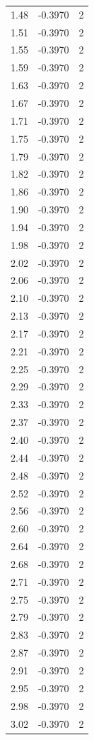 \begin{longtable}{lrr}
  1.48 & -0.3970 & 2 \\
  1.51 & -0.3970 & 2 \\
  1.55 & -0.3970 & 2 \\
  1.59 & -0.3970 & 2 \\
  1.63 & -0.3970 & 2 \\
  1.67 & -0.3970 & 2 \\
  1.71 & -0.3970 & 2 \\
  1.75 & -0.3970 & 2 \\
  1.79 & -0.3970 & 2 \\
  1.82 & -0.3970 & 2 \\
  1.86 & -0.3970 & 2 \\
  1.90 & -0.3970 & 2 \\
  1.94 & -0.3970 & 2 \\
  1.98 & -0.3970 & 2 \\
  2.02 & -0.3970 & 2 \\
  2.06 & -0.3970 & 2 \\
  2.10 & -0.3970 & 2 \\
  2.13 & -0.3970 & 2 \\
  2.17 & -0.3970 & 2 \\
  2.21 & -0.3970 & 2 \\
  2.25 & -0.3970 & 2 \\
  2.29 & -0.3970 & 2 \\
  2.33 & -0.3970 & 2 \\
  2.37 & -0.3970 & 2 \\
  2.40 & -0.3970 & 2 \\
  2.44 & -0.3970 & 2 \\
  2.48 & -0.3970 & 2 \\
  2.52 & -0.3970 & 2 \\
  2.56 & -0.3970 & 2 \\
  2.60 & -0.3970 & 2 \\
  2.64 & -0.3970 & 2 \\
  2.68 & -0.3970 & 2 \\
  2.71 & -0.3970 & 2 \\
  2.75 & -0.3970 & 2 \\
  2.79 & -0.3970 & 2 \\
  2.83 & -0.3970 & 2 \\
  2.87 & -0.3970 & 2 \\
  2.91 & -0.3970 & 2 \\
  2.95 & -0.3970 & 2 \\
  2.98 & -0.3970 & 2 \\
  3.02 & -0.3970 & 2 \\

\end{longtable}
